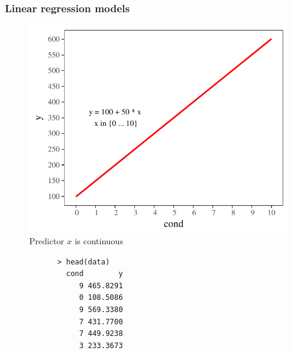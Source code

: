 \begin{frame}[fragile]
	\frametitle{Linear regression models}
	
	\begin{minipage}{.55\textwidth}
	\begin{figure}		
		\includegraphics[scale= .5]{gfx/lm.pdf}
		\caption{Predictor $x$ is continuous}
	\end{figure}
	\end{minipage}
\hfill
	\begin{minipage}{.35\textwidth}
		\begin{verbatim}
			> head(data)
			  cond        y
			     9 465.8291
			     0 108.5086
			     9 569.3380
			     7 431.7700
			     7 449.9238
			     3 233.3673
		\end{verbatim}
	\end{minipage}
		
\end{frame}




